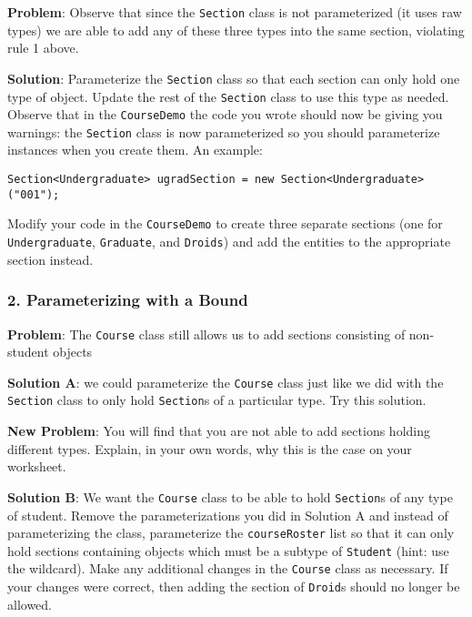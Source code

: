 \documentclass[12pt]{scrartcl}
\begin{document}
\textbf{Problem}: Observe that since the \texttt{Section} 
class is not parameterized (it uses raw types) we are able to add 
any of these three types into the same section, violating rule 1 
above.

\textbf{Solution}: Parameterize the \texttt{Section} class 
so that each section can only hold one type of object.  Update the rest 
of the \texttt{Section} class to use this type as needed.
Observe that in the \texttt{CourseDemo} the code you wrote 
should now be giving you warnings: the \texttt{Section} 
class is now parameterized so you should parameterize instances 
when you create them.  An example:

\texttt{Section<Undergraduate> ugradSection = new Section<Undergraduate>("001");}

Modify your code in the \texttt{CourseDemo} to create three 
separate sections (one for \texttt{Undergraduate}, 
\texttt{Graduate}, and \texttt{Droids}) and 
add the entities to the appropriate section instead.

\subsubsection*{2. Parameterizing with a Bound}

\textbf{Problem}: The \texttt{Course} class still allows 
us to add sections consisting of non-student objects  

\textbf{Solution A}: we could parameterize the \texttt{Course} 
class just like we did with the \texttt{Section} class 
to only hold \texttt{Section}s of a particular type.   
Try this solution.

\textbf{New Problem}: You will find that you are not able to add 
sections holding different types.  Explain, in your own words, 
why this is the case on your worksheet.

\textbf{Solution B}: We want the \texttt{Course} class to 
be able to hold \texttt{Section}s of any type of student.  
Remove the parameterizations you did in Solution A and instead of 
parameterizing the class, parameterize the \texttt{courseRoster} 
list so that it can only hold sections containing objects which must 
be a subtype of \texttt{Student} (hint: use the wildcard).  
Make any additional changes in the \texttt{Course} class 
as necessary.  If your changes were correct, then adding the section 
of \texttt{Droid}s should no longer be allowed.
\end{document}
